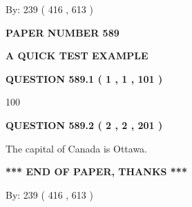 \documentclass[12pt]{article}
\begin{document}
   
\hspace{1.0in} By: 
 239 ( 416 ,  613 )
   
   
   
   
\newpage 
\setcounter{page}{ 
   589001 } 
   
   
   
   
 {\textbf{ \Large{ PAPER NUMBER  589  }}}
   
   
\vspace{0.2in}
   
   
   
   
   
   
 \vspace{0.2in}
{\LARGE {\textbf{ A QUICK TEST EXAMPLE}}}
   
   
  
\vspace{0.2in}
  
{\textbf{\Large{QUESTION
589.1 
 ( 1 , 1 , 101 )
}}}
  
  
 
 
\noindent{}

100
 
 
  
\vspace{0.2in}
  
{\textbf{\Large{QUESTION
589.2 
 ( 2 , 2 , 201 )
}}}
  
  
 
 
\noindent{}
 
 
The capital of Canada is Ottawa.
 
 
 
 
   
   
 \vspace{0.2in}
 
   
   
   
   
\vspace{1.0in} 
{\textbf{\large{ *** END OF PAPER, THANKS *** }}} 
   
   
\hspace{1.0in} By: 
 239 ( 416 ,  613 )
   
   
   
   
\newpage 
\setcounter{page}{ 
   590001 } 
   
   
   
\end{document}

